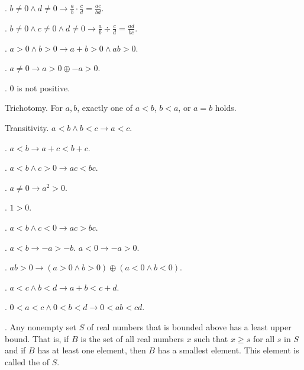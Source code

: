 \documentclass{slnotes}
\begin{document}
. \(b \neq 0 \land d \neq 0 \to \frac{a}{b} \cdot \frac{c}{d} = \frac{ac}{bd}\).

. \(b \neq 0 \land c \neq 0 \land d \neq 0 \to \frac{a}{b} \div \frac{c}{d} = \frac{ad}{bc}\).

. \(a > 0 \land b > 0 \to a + b > 0 \land ab > 0\).

. \(a \neq 0 \to a > 0 \oplus -a > 0\).

. \(0\) is not positive.

 Trichotomy. For \(a, b\), exactly one of \(a < b\), \(b < a\), or \(a = b\) holds.

 Transitivity. \(a < b \land b < c \to a < c\).

. \(a < b \to a + c < b + c\).

. \(a < b \land c > 0 \to ac < bc\).

. \(a \neq 0 \to a^2 > 0\).

. \(1 > 0\).

. \(a < b \land c < 0 \to ac > bc\).

. \(a < b \to -a > -b\). \(a < 0 \to -a > 0\).

. \(ab > 0 \to (a > 0 \land b > 0) \oplus (a < 0 \land b < 0)\).

. \(a < c \land b < d \to a + b < c + d\).

. \(0 < a < c \land 0 < b < d \to 0 < ab < cd\).

. Any nonempty set \(S\) of real numbers that is bounded above has a least upper bound. That is, if \(B\) is the set of all real numbers \(x\) such that \(x \ge s\) for all \(s\) in \(S\) and if \(B\) has at least one element, then \(B\) has a smallest element. This element is called the  of \(S\).
\end{document}
